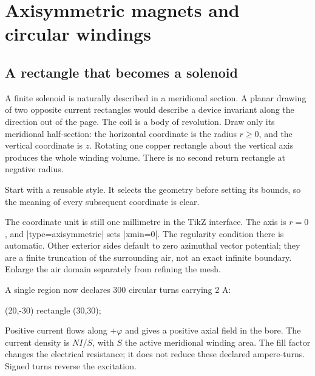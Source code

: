 \section{Axisymmetric magnets and circular windings}
\label{sec:axisymmetric}

\subsection{A rectangle that becomes a solenoid}
A finite solenoid is naturally described in a meridional section.
A planar drawing of two opposite current rectangles would describe a device
invariant along the direction out of the page. The coil is a body of
revolution. Draw only its meridional half-section: the horizontal
coordinate is the radius $r\geq0$, and the vertical coordinate is $z$.
Rotating one copper rectangle about the vertical axis produces the whole
winding volume. There is no second return rectangle at negative radius.

Start with a reusable style. It selects the geometry before setting its
bounds, so the meaning of every subsequent coordinate is clear.
\begin{codeexample}
\end{codeexample}
The coordinate unit is still one millimetre in the TikZ interface. The axis is
$r=0$, and |type=axisymmetric| sets |xmin=0|. The regularity condition there is
automatic. Other exterior sides default to zero azimuthal vector potential;
they are a finite truncation of the surrounding air, not an exact infinite
boundary. Enlarge the air domain separately from refining the mesh.

A single region now declares 300 circular turns carrying 2 A:
\begin{codeexample}
\filldraw[fill=orange!25,draw=orange!70!black,
  femm/region={material=copper,circuit=coil,turns=300,
    winding fill=.6,mesh size=1}]
  (20,-30) rectangle (30,30);
\end{codeexample}
Positive current flows along $+\varphi$ and gives a positive axial field in the
bore. The current density is $NI/S$, with $S$ the active meridional winding
area. The fill factor changes the electrical resistance; it does not reduce
these declared ampere-turns. Signed turns reverse the excitation.

